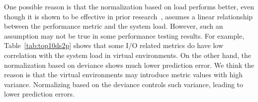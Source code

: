 \documentclass[smallextended]{svjour3}       %
\begin{document}
One possible reason is that the normalization based on load performs better, even though it is shown to be effective in prior research~\cite{Nguyen:2012:ADP:2188286.2188344}, assumes a linear relationship between the performance metric and the system load. However, such an assumption may not be true in some performance testing results. For example, Table~\ref{tab:top10ds2p} shows that some I/O related metrics do have low correlation with the system load in virtual environments. On the other hand, the normalization based on deviance shows much lower prediction error. We think the reason is that the virtual environments may introduce metric values with high variance. Normalizing based on the deviance controls such variance, leading to lower prediction errors.



\begin{table}[tbh]
	\centering
	\caption{Summary of statistical models built for DS2. The metrics listed in the table are the significant independent variables.}
	\label{tab:modelsummaryds2}
\end{table}
\end{document}
